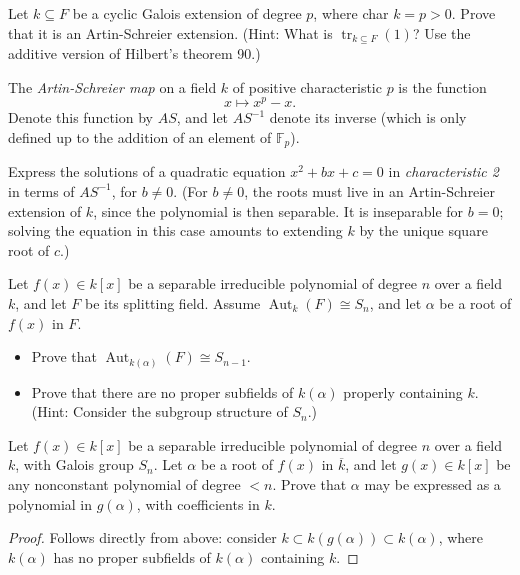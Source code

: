 \documentclass[openany]{book}
\begin{document}
\begin{prob}
Let \( k \subseteq F \) be a cyclic Galois extension of degree \( p \), where char \( k = p > 0 \).  
Prove that it is an Artin-Schreier extension. (Hint: What is \( \operatorname{tr}_{k \subseteq F}(1) \)? Use the additive version of Hilbert's theorem 90.)
\end{prob}

\begin{prob}
The \emph{Artin-Schreier map} on a field \( k \) of positive characteristic \( p \) is the function  
\[x \mapsto x^p - x.\]  
Denote this function by \( \mathit{AS} \), and let \( \mathit{AS}^{-1} \) denote its inverse (which is only defined up to the addition of an element of \( \mathbb{F}_p \)).

Express the solutions of a quadratic equation \( x^2 + bx + c = 0 \) in \emph{characteristic 2} in terms of \( \mathit{AS}^{-1} \), for \( b \neq 0 \). (For \( b \neq 0 \), the roots must live in an Artin-Schreier extension of \( k \), since the polynomial is then separable. It is inseparable for \( b = 0 \); solving the equation in this case amounts to extending \( k \) by the unique square root of \( c \).)
\end{prob}

\begin{prob}
Let \( f(x) \in k[x] \) be a separable irreducible polynomial of degree \( n \) over a field \( k \), and let \( F \) be its splitting field. Assume \( \operatorname{Aut}_{k}(F) \cong S_n \), and let \( \alpha \) be a root of \( f(x) \) in \( F \).  

\begin{itemize}
    \item Prove that \( \operatorname{Aut}_{k(\alpha)}(F) \cong S_{n-1} \).  
    \item Prove that there are no proper subfields of \( k(\alpha) \) properly containing \( k \). (Hint: Consider the subgroup structure of \( S_n \).)
\end{itemize}
\end{prob}



\begin{prob}
Let \( f(x) \in k[x] \) be a separable irreducible polynomial of degree \( n \) over a field \( k \), with Galois group \( S_n \). Let \( \alpha \) be a root of \( f(x) \) in \( \overline{k} \), and let \( g(x) \in k[x] \) be any nonconstant polynomial of degree \( < n \). Prove that \( \alpha \) may be expressed as a polynomial in \( g(\alpha) \), with coefficients in \( k \).
\end{prob}
\begin{proof}
    Follows directly from above: consider $k\subset k(g(\alpha))\subset k(\alpha)$, where $k(\alpha)$ has no proper subfields of $k(\alpha)$ containing $k$. 
\end{proof}
\end{document}
